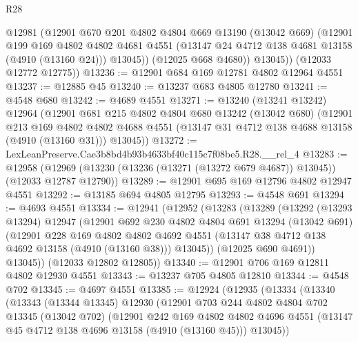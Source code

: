 \begin{lexlean}{R28}
\begin{coremodule}
            @12981
            (@12901
              @670
              @201
              @4802
              @4804
              @669
              @13190
              (@13042 @669)
              (@12901
                @199
                @169
                @4802
                @4802
                @4681
                @4551
                (@13147 @24 @4712 @138 @4681 @13158 (@4910 (@13160 @24)))
                @13045))
            (@12025 @668 @4680))
          @13045))
      (@12033 @12772 @12775))
@13236 := @12901 @684 @169 @12781 @4802 @12964 @4551
@13237 := @12885 @45
@13240 := @13237 @683 @4805 @12780
@13241 := @4548 @680
@13242 := @4689 @4551
@13271 := @13240
    (@13241 @13242)
    @12964
    (@12901
      @681
      @215
      @4802
      @4804
      @680
      @13242
      (@13042 @680)
      (@12901
        @213
        @169
        @4802
        @4802
        @4688
        @4551
        (@13147 @31 @4712 @138 @4688 @13158 (@4910 (@13160 @31)))
        @13045))
@13272 := LexLeanPreserve.Cae3b8bd4b93b4633bf40c115c7f08be5.R28.__rel_4
@13283 := @12958
    (@12969 (@13230 (@13236 (@13271 (@13272 @679 @4687)) @13045)) (@12033 @12787 @12790))
@13289 := @12901 @695 @169 @12796 @4802 @12947 @4551
@13292 := @13185 @694 @4805 @12795
@13293 := @4548 @691
@13294 := @4693 @4551
@13334 := @12941
    (@12952
      (@13283
        (@13289
          (@13292
            (@13293 @13294)
            @12947
            (@12901
              @692
              @230
              @4802
              @4804
              @691
              @13294
              (@13042 @691)
              (@12901
                @228
                @169
                @4802
                @4802
                @4692
                @4551
                (@13147 @38 @4712 @138 @4692 @13158 (@4910 (@13160 @38)))
                @13045))
            (@12025 @690 @4691))
          @13045))
      (@12033 @12802 @12805))
@13340 := @12901 @706 @169 @12811 @4802 @12930 @4551
@13343 := @13237 @705 @4805 @12810
@13344 := @4548 @702
@13345 := @4697 @4551
@13385 := @12924
    (@12935
      (@13334
        (@13340
          (@13343
            (@13344 @13345)
            @12930
            (@12901
              @703
              @244
              @4802
              @4804
              @702
              @13345
              (@13042 @702)
              (@12901
                @242
                @169
                @4802
                @4802
                @4696
                @4551
                (@13147 @45 @4712 @138 @4696 @13158 (@4910 (@13160 @45)))
                @13045))

\end{coremodule}
\end{lexlean}
